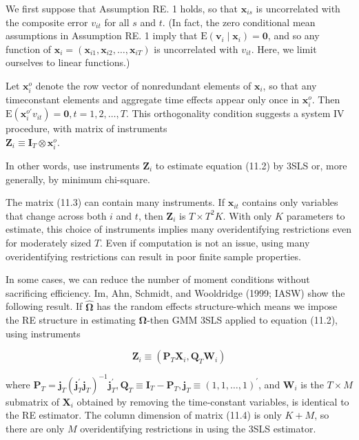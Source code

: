 \documentclass[10pt]{article}
\begin{document}
We first suppose that Assumption RE. 1 holds, so that $\mathbf{x}_{i s}$ is uncorrelated with the composite error $v_{i t}$ for all $s$ and $t$. (In fact, the zero conditional mean assumptions in Assumption RE. 1 imply that $\mathrm{E}\left(\mathbf{v}_{i} \mid \mathbf{x}_{i}\right)=\mathbf{0}$, and so any function of $\mathbf{x}_{i}= \left(\mathbf{x}_{i 1}, \mathbf{x}_{i 2}, \ldots, \mathbf{x}_{i T}\right)$ is uncorrelated with $v_{i t}$. Here, we limit ourselves to linear functions.)

Let $\mathbf{x}_{i}^{o}$ denote the row vector of nonredundant elements of $\mathbf{x}_{i}$, so that any timeconstant elements and aggregate time effects appear only once in $\mathbf{x}_{i}^{o}$. Then $\mathrm{E}\left(\mathbf{x}_{i}^{o \prime} v_{i t}\right)= \mathbf{0}, t=1,2, \ldots, T$. This orthogonality condition suggests a system IV procedure, with matrix of instruments\\
$\mathbf{Z}_{i} \equiv \mathbf{I}_{T} \otimes \mathbf{x}_{i}^{o}$.

In other words, use instruments $\mathbf{Z}_{i}$ to estimate equation (11.2) by 3SLS or, more generally, by minimum chi-square.

The matrix (11.3) can contain many instruments. If $\mathbf{x}_{i t}$ contains only variables that change across both $i$ and $t$, then $\mathbf{Z}_{i}$ is $T \times T^{2} K$. With only $K$ parameters to estimate, this choice of instruments implies many overidentifying restrictions even for moderately sized $T$. Even if computation is not an issue, using many overidentifying restrictions can result in poor finite sample properties.

In some cases, we can reduce the number of moment conditions without sacrificing efficiency. Im, Ahn, Schmidt, and Wooldridge (1999; IASW) show the following result. If $\hat{\boldsymbol{\Omega}}$ has the random effects structure-which means we impose the RE structure in estimating $\boldsymbol{\Omega}$-then GMM 3SLS applied to equation (11.2), using instruments


\begin{equation*}
\mathbf{Z}_{i} \equiv\left(\mathbf{P}_{T} \mathbf{X}_{i}, \mathbf{Q}_{T} \mathbf{W}_{i}\right) \tag{11.4}
\end{equation*}


where $\mathbf{P}_{T}=\mathbf{j}_{T}\left(\mathbf{j}_{T}^{\prime} \mathbf{j}_{T}\right)^{-1} \mathbf{j}_{T}^{\prime}, \mathbf{Q}_{T} \equiv \mathbf{I}_{T}-\mathbf{P}_{T}, \mathbf{j}_{T} \equiv(1,1, \ldots, 1)^{\prime}$, and $\mathbf{W}_{i}$ is the $T \times M$ submatrix of $\mathbf{X}_{i}$ obtained by removing the time-constant variables, is identical to the RE estimator. The column dimension of matrix (11.4) is only $K+M$, so there are only $M$ overidentifying restrictions in using the 3SLS estimator.
\end{document}
